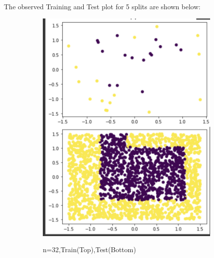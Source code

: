 \documentclass[a4paper]{article}
\theoremstyle{definition}
\newenvironment{soln}{
    \leavevmode\color{blue}\ignorespaces
}{}
\begin{document}
\begin{soln}
    The observed Training and Test plot for 5 splits are shown below:\\
    \begin{figure}[H]
        \begin{subfigure}{0.5\textwidth}
            \centering
            \includegraphics[scale=0.5]{sk32.png}
            \label{fig:q2}
            \caption{n=32,Train(Top),Test(Bottom)}
        \end{subfigure}%
        \begin{subfigure}{0.5\textwidth}
         \centering

\end{subfigure}
\end{figure}
\end{soln}
\end{document}
